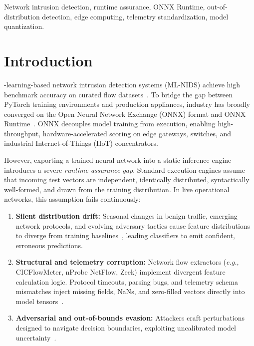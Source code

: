 \documentclass[journal]{IEEEtran}
\newcommand{\eg}{\emph{e.g.}}
\begin{document}
\begin{IEEEkeywords}
Network intrusion detection, runtime assurance, ONNX Runtime, out-of-distribution detection, edge computing, telemetry standardization, model quantization.
\end{IEEEkeywords}


\section{Introduction}
\label{sec:introduction}

-learning-based network intrusion detection systems (ML-NIDS) achieve high benchmark accuracy on curated flow datasets~\cite{sharafaldin2018cicids,moustafa2021toniot}. To bridge the gap between PyTorch training environments and production appliances, industry has broadly converged on the Open Neural Network Exchange (ONNX) format and ONNX Runtime~\cite{onnxruntime2024}. ONNX decouples model training from execution, enabling high-throughput, hardware-accelerated scoring on edge gateways, switches, and industrial Internet-of-Things (IIoT) concentrators.

However, exporting a trained neural network into a static inference engine introduces a severe \emph{runtime assurance gap}. Standard execution engines assume that incoming test vectors are independent, identically distributed, syntactically well-formed, and drawn from the training distribution. In live operational networks, this assumption fails continuously:
\begin{enumerate}[leftmargin=*]
  \item \textbf{Silent distribution drift:} Seasonal changes in benign traffic, emerging network protocols, and evolving adversary tactics cause feature distributions to diverge from training baselines~\cite{aceto2024driftNIDS}, leading classifiers to emit confident, erroneous predictions.
  \item \textbf{Structural and telemetry corruption:} Network flow extractors (\eg, CICFlowMeter, nProbe NetFlow, Zeek) implement divergent feature calculation logic. Protocol timeouts, parsing bugs, and telemetry schema mismatches inject missing fields, NaNs, and zero-filled vectors directly into model tensors~\cite{jajal2024onnxfailures,sarhan2022nftoniot}.
  \item \textbf{Adversarial and out-of-bounds evasion:} Attackers craft perturbations designed to navigate decision boundaries, exploiting uncalibrated model uncertainty~\cite{apruzzese2023adversarialML}.
\end{enumerate}
\end{document}
